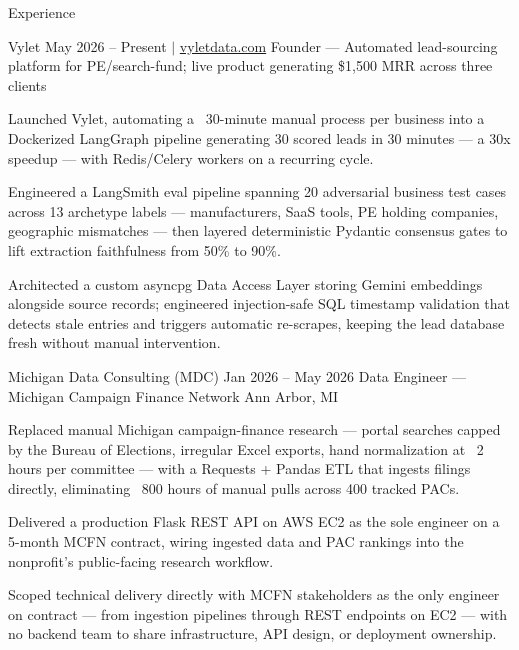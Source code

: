 \documentclass[
	11pt
]{../../../template}
\begin{document}
	\begin{rSection}{E}{xperience}
		\begin{rSectionEntry}
			{Vylet}
			{May 2026 -- Present $\vert$ \href{https://vyletdata.com}{vyletdata.com}}
			{Founder --- Automated lead-sourcing platform for PE/search-fund; live product generating \$1,500 MRR across three clients}
			{}
			{}

			\item Launched Vylet, automating a ~30-minute manual process per business into a Dockerized LangGraph pipeline generating 30 scored leads in 30 minutes --- a 30x speedup --- with Redis/Celery workers on a recurring cycle.
			\item Engineered a LangSmith eval pipeline spanning 20 adversarial business test cases across 13 archetype labels --- manufacturers, SaaS tools, PE holding companies, geographic mismatches --- then layered deterministic Pydantic consensus gates to lift extraction faithfulness from 50\% to 90\%.
			\item Architected a custom asyncpg Data Access Layer storing Gemini embeddings alongside source records; engineered injection-safe SQL timestamp validation that detects stale entries and triggers automatic re-scrapes, keeping the lead database fresh without manual intervention.
		\end{rSectionEntry}

		\begin{rSectionEntry}
			{Michigan Data Consulting (MDC)}
			{Jan 2026 -- May 2026}
			{Data Engineer --- Michigan Campaign Finance Network}
			{}
			{Ann Arbor, MI}

			\item Replaced manual Michigan campaign-finance research --- portal searches capped by the Bureau of Elections, irregular Excel exports, hand normalization at ~2 hours per committee --- with a Requests + Pandas ETL that ingests filings directly, eliminating ~800 hours of manual pulls across 400 tracked PACs.
			\item Delivered a production Flask REST API on AWS EC2 as the sole engineer on a 5-month MCFN contract, wiring ingested data and PAC rankings into the nonprofit's public-facing research workflow.
			\item Scoped technical delivery directly with MCFN stakeholders as the only engineer on contract --- from ingestion pipelines through REST endpoints on EC2 --- with no backend team to share infrastructure, API design, or deployment ownership.
		\end{rSectionEntry}


\end{rSection}
\end{document}
